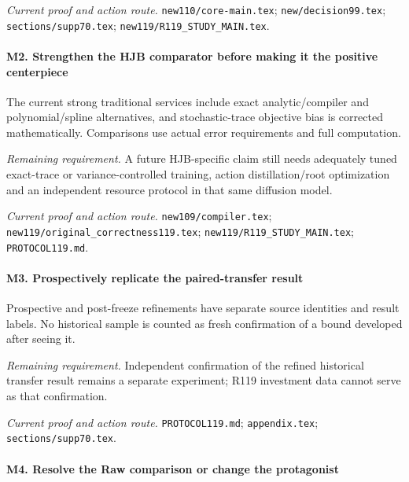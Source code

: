 \par\emph{Current proof and action route.} \nolinkurl{new110/core-main.tex}; \nolinkurl{new/decision99.tex}; \nolinkurl{sections/supp70.tex}; \nolinkurl{new119/R119_STUDY_MAIN.tex}.

\paragraph{M2. Strengthen the HJB comparator before making it the positive centerpiece}

The current strong traditional services include exact analytic/\allowbreak{}compiler and polynomial/\allowbreak{}spline alternatives, and stochastic-trace objective bias is corrected mathematically. Comparisons use actual error requirements and full computation.

\par\emph{Remaining requirement.} A future HJB-specific claim still needs adequately tuned exact-trace or variance-controlled training, action distillation/\allowbreak{}root optimization and an independent resource protocol in that same diffusion model.

\par\emph{Current proof and action route.} \nolinkurl{new109/compiler.tex}; \nolinkurl{new119/original_correctness119.tex}; \nolinkurl{new119/R119_STUDY_MAIN.tex}; \nolinkurl{PROTOCOL119.md}.

\paragraph{M3. Prospectively replicate the paired-transfer result}

Prospective and post-freeze refinements have separate source identities and result labels. No historical sample is counted as fresh confirmation of a bound developed after seeing it.

\par\emph{Remaining requirement.} Independent confirmation of the refined historical transfer result remains a separate experiment; R119 investment data cannot serve as that confirmation.

\par\emph{Current proof and action route.} \nolinkurl{PROTOCOL119.md}; \nolinkurl{appendix.tex}; \nolinkurl{sections/supp70.tex}.

\paragraph{M4. Resolve the Raw comparison or change the protagonist}

